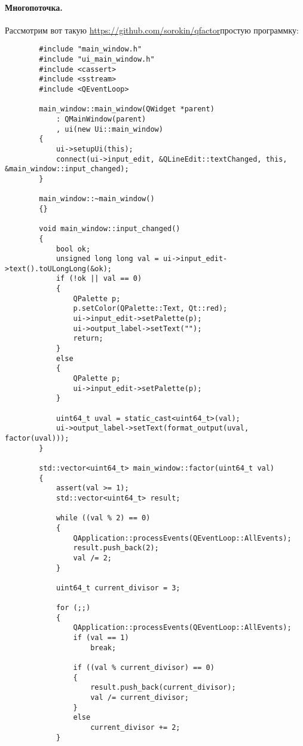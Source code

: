 \documentclass{article}
\begin{document}
    \paragraph{Многопоточка.}
    Рассмотрим вот такую \url{https://github.com/sorokin/qfactor}{простую программку}:
    \begin{verbatim}
        #include "main_window.h"
        #include "ui_main_window.h"
        #include <cassert>
        #include <sstream>
        #include <QEventLoop>
        
        main_window::main_window(QWidget *parent)
            : QMainWindow(parent)
            , ui(new Ui::main_window)
        {
            ui->setupUi(this);
            connect(ui->input_edit, &QLineEdit::textChanged, this, &main_window::input_changed);
        }
        
        main_window::~main_window()
        {}
        
        void main_window::input_changed()
        {
            bool ok;
            unsigned long long val = ui->input_edit->text().toULongLong(&ok);
            if (!ok || val == 0)
            {
                QPalette p;
                p.setColor(QPalette::Text, Qt::red);
                ui->input_edit->setPalette(p);
                ui->output_label->setText("");
                return;
            }
            else
            {
                QPalette p;
                ui->input_edit->setPalette(p);
            }
            
            uint64_t uval = static_cast<uint64_t>(val);
            ui->output_label->setText(format_output(uval, factor(uval)));
        }
        
        std::vector<uint64_t> main_window::factor(uint64_t val)
        {
            assert(val >= 1);
            std::vector<uint64_t> result;
            
            while ((val % 2) == 0)
            {
                QApplication::processEvents(QEventLoop::AllEvents);
                result.push_back(2);
                val /= 2;
            }
            
            uint64_t current_divisor = 3;
            
            for (;;)
            {
                QApplication::processEvents(QEventLoop::AllEvents);
                if (val == 1)
                    break;
                
                if ((val % current_divisor) == 0)
                {
                    result.push_back(current_divisor);
                    val /= current_divisor;
                }
                else
                    current_divisor += 2;
            }
            

\end{verbatim}
\end{document}
